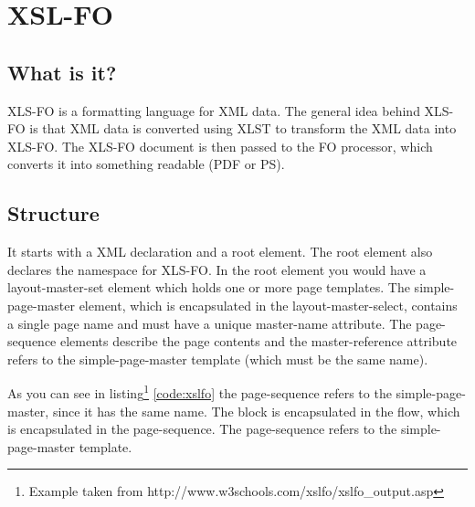 \chapter{XSL-FO}
\label{chap:xsl-fo}

\section{What is it?}

XLS-FO \cite{wikixslfo,w3schoolxslfo} is a formatting language for XML data. The general idea behind XLS-FO is that XML data is converted using XLST to transform the XML data into XLS-FO. The XLS-FO document is then passed to the FO processor, which converts it into something readable (PDF or PS). 

\section{Structure}

It starts with a XML declaration and a root element. The root element also declares the namespace for XLS-FO. In the root element you would have a layout-master-set element which holds one or more page templates. The simple-page-master element, which is encapsulated in the layout-master-select, contains a single page name and must have a unique master-name attribute. The page-sequence elements describe the page contents and the master-reference attribute refers to the simple-page-master template (which must be the same name). 



As you can see in listing\footnote{Example taken from http://www.w3schools.com/xslfo/xslfo\_output.asp} \ref{code:xslfo} the page-sequence refers to the simple-page-master, since it has the same name. The block is encapsulated in the flow, which is encapsulated in the page-sequence. The page-sequence refers to the simple-page-master template.